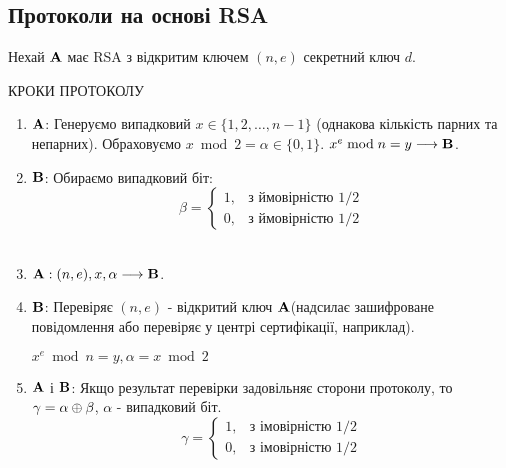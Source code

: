 \subsection{Протоколи на основі RSA}
Нехай $\bold{A}$ має RSA з відкритим ключем $(n, e)$ секретний ключ $d$.
\begin{center}
КРОКИ ПРОТОКОЛУ
\end{center}
\begin{enumerate}

\item $\bold{A}$: Генеруємо випадковий $x\in\{1, 2,\ldots, n-1\}$ (однакова кількість парних та непарних). Обраховуємо $x\bmod 2 = \alpha\in\{0,1\}$. $x^e\bmod n = y\longrightarrow \bold{B}$.
\item $\bold{B}$: Обираємо випадковий біт:
\begin{equation*}
\beta = 
	\begin{cases}
		1, &\text{з ймовірністю 1/2}\\
		0, &\text{з ймовірністю 1/2}
	\end{cases}
\end{equation*}\\
\item $\bold{A}: (n, e), x, \alpha \longrightarrow \bold{B}$.
\item $\bold{B}$: Перевіряє $(n, e)$ - відкритий ключ $\bold{A}$(надсилає зашифроване повідомлення або перевіряє у центрі сертифікації, наприклад).
\begin{center}
$x^e\bmod n = y, \alpha = x\bmod 2$
\end{center}
\item $\bold{A}$ і $\bold{B}$: Якщо результат перевірки задовільняє сторони протоколу, то $\gamma = \alpha \oplus \beta$, $\alpha$ - випадковий біт.
\begin{equation*}
\gamma = 
	\begin{cases}
		1, &\text{з імовірністю 1/2}\\
		0, &\text{з імовірністю 1/2}
	\end{cases}
\end{equation*}
\end{enumerate}

%

